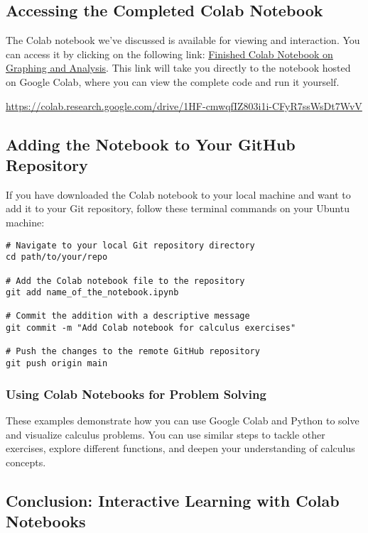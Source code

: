 \documentclass[a4paper,12pt]{book}
\newcounter{problem}
\newcounter{example}
\begin{document}
\subsection*{Accessing the Completed Colab Notebook}

The Colab notebook we've discussed is available for viewing and interaction. You can access it by clicking on the following link: \href{https://colab.research.google.com/drive/1HF-cmwqfIZ803i1i-CFyR7ssWsDt7WvV}{Finished Colab Notebook on Graphing and Analysis}. This link will take you directly to the notebook hosted on Google Colab, where you can view the complete code and run it yourself.

\url{https://colab.research.google.com/drive/1HF-cmwqfIZ803i1i-CFyR7ssWsDt7WvV}

\subsection*{Adding the Notebook to Your GitHub Repository}

If you have downloaded the Colab notebook to your local machine and want to add it to your Git repository, follow these terminal commands on your Ubuntu machine:

\begin{verbatim}
# Navigate to your local Git repository directory
cd path/to/your/repo

# Add the Colab notebook file to the repository
git add name_of_the_notebook.ipynb

# Commit the addition with a descriptive message
git commit -m "Add Colab notebook for calculus exercises"

# Push the changes to the remote GitHub repository
git push origin main
\end{verbatim}


\subsubsection*{Using Colab Notebooks for Problem Solving}
These examples demonstrate how you can use Google Colab and Python to solve and visualize calculus problems. You can use similar steps to tackle other exercises, explore different functions, and deepen your understanding of calculus concepts.

\subsection*{Conclusion: Interactive Learning with Colab Notebooks}
\end{document}
